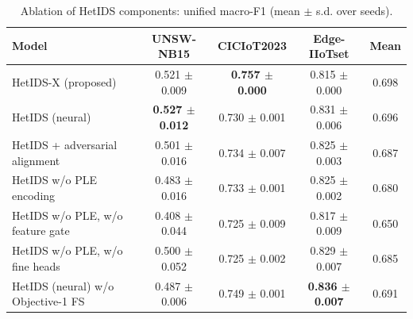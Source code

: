 \begin{table}[htbp]\centering\scriptsize
\caption{Ablation of HetIDS components: unified macro-F1 (mean $\pm$ s.d. over seeds).}
\label{tab:ablation}
\begin{tabular}{lcccc}
\toprule
Model & UNSW-NB15 & CICIoT2023 & Edge-IIoTset & Mean \\
\midrule
HetIDS-X (proposed) & 0.521 $\pm$ 0.009 & \textbf{0.757 $\pm$ 0.000} & 0.815 $\pm$ 0.000 & 0.698 \\
HetIDS (neural) & \textbf{0.527 $\pm$ 0.012} & 0.730 $\pm$ 0.001 & 0.831 $\pm$ 0.006 & 0.696 \\
HetIDS + adversarial alignment & 0.501 $\pm$ 0.016 & 0.734 $\pm$ 0.007 & 0.825 $\pm$ 0.003 & 0.687 \\
HetIDS w/o PLE encoding & 0.483 $\pm$ 0.016 & 0.733 $\pm$ 0.001 & 0.825 $\pm$ 0.002 & 0.680 \\
HetIDS w/o PLE, w/o feature gate & 0.408 $\pm$ 0.044 & 0.725 $\pm$ 0.009 & 0.817 $\pm$ 0.009 & 0.650 \\
HetIDS w/o PLE, w/o fine heads & 0.500 $\pm$ 0.052 & 0.725 $\pm$ 0.002 & 0.829 $\pm$ 0.007 & 0.685 \\
HetIDS (neural) w/o Objective-1 FS & 0.487 $\pm$ 0.006 & 0.749 $\pm$ 0.001 & \textbf{0.836 $\pm$ 0.007} & 0.691 \\
\bottomrule
\end{tabular}
\end{table}